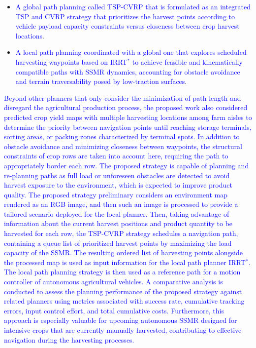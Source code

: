 \documentclass[conference]{IEEEtran}
\begin{document}
\begin{itemize}
    \item \textcolor{blue}{A global path planning called TSP-CVRP that is formulated as an integrated TSP and CVRP strategy that prioritizes the harvest points according to vehicle payload capacity constraints versus closeness between crop harvest locations}.
    \item \textcolor{blue}{A local path planning coordinated with a global one that explores scheduled harvesting waypoints based on IRRT$^*$ to achieve feasible and kinematically compatible paths with SSMR dynamics, accounting for obstacle avoidance and terrain traversability posed by low-traction surfaces}.
\end{itemize}

\textcolor{blue}{Beyond other planners that only consider the minimization of path length and disregard the agricultural production process, the proposed work also considered predicted crop yield maps with multiple harvesting locations among farm aisles to determine the priority between navigation points until reaching storage terminals, sorting areas, or packing zones characterized by terminal spots. In addition to obstacle avoidance and minimizing closeness between waypoints, the structural constraints of crop rows are taken into account here, requiring the path to appropriately border each row. The proposed strategy is capable of planning and re-planning paths as full load or unforeseen obstacles are detected to avoid harvest exposure to the environment, which is expected to improve product quality. The proposed strategy preliminary considers an environment map rendered as an RGB image, and then such an image is processed to provide a tailored scenario deployed for the local planner. Then, taking advantage of information about the current harvest positions and product quantity to be harvested for each row, the TSP-CVRP strategy schedules a navigation path, containing a queue list of prioritized harvest points by maximizing the load capacity of the SSMR. The resulting ordered list of harvesting points alongside the processed map is used as input information for the local path planner IRRT$^*$. The local path planning strategy is then used as a reference path for a motion controller of autonomous agricultural vehicles. A comparative analysis is conducted to assess the planning performance of the proposed strategy against related planners using metrics associated with success rate, cumulative tracking errors, input control effort, and total cumulative costs. Furthermore, this approach is especially valuable for upcoming autonomous SSMR designed for intensive crops that are currently manually harvested, contributing to effective navigation during the harvesting processes.}
\end{document}
